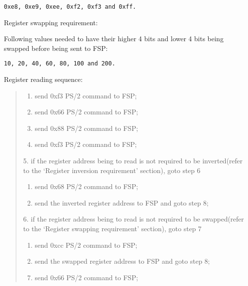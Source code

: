 \documentclass[a4paper,8pt,english]{sphinxmanual}
\begin{document}
\begin{Verbatim}[commandchars=\\\{\}]
0xe8, 0xe9, 0xee, 0xf2, 0xf3 and 0xff.
\end{Verbatim}

Register swapping requirement:

Following values needed to have their higher 4 bits and lower 4 bits being
swapped before being sent to FSP:

\begin{Verbatim}[commandchars=\\\{\}]
10, 20, 40, 60, 80, 100 and 200.
\end{Verbatim}

Register reading sequence:
\begin{quote}
\begin{enumerate}
\item {} 
send 0xf3 PS/2 command to FSP;

\item {} 
send 0x66 PS/2 command to FSP;

\item {} 
send 0x88 PS/2 command to FSP;

\item {} 
send 0xf3 PS/2 command to FSP;

\end{enumerate}

5. if the register address being to read is not required to be
inverted(refer to the `Register inversion requirement' section),
goto step 6
\begin{enumerate}
\item {} 
send 0x68 PS/2 command to FSP;

\item {} 
send the inverted register address to FSP and goto step 8;

\end{enumerate}

6. if the register address being to read is not required to be
swapped(refer to the `Register swapping requirement' section),
goto step 7
\begin{enumerate}
\item {} 
send 0xcc PS/2 command to FSP;

\item {} 
send the swapped register address to FSP and goto step 8;

\end{enumerate}
\begin{enumerate}
\setcounter{enumi}{6}
\item {} 
send 0x66 PS/2 command to FSP;


\end{enumerate}
\end{quote}
\end{document}
